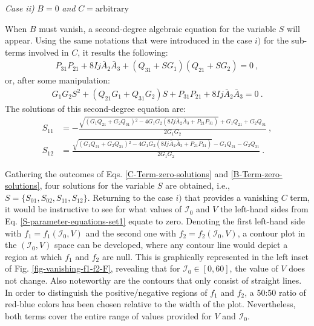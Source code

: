 \textit{Case ii)} $B=0$ \textit{and} $C=\text{arbitrary}$

When $B$ must vanish, a second-degree algebraic equation for the variable $S$ will appear. Using the same notations that were introduced in the case $i)$ for the sub-terms involved in $C$, it results the following:
\begin{align}
    P_{31}P_{21}+8Ij\bar{A}_2\bar{A}_3+\left(Q_{31}+SG_1\right)\left(Q_{21}+SG_2\right)=0\ , \nonumber
\end{align}
or, after some manipulation:
\begin{align}
    G_1G_2S^2+\left(Q_{21}G_1+Q_{31}G_2\right)S+P_{31}P_{21}+8Ij\bar{A}_2\bar{A}_3=0\ .
    \label{S-parameter-equations-set2}
\end{align}
The solutions of this second-degree equation are:
\begin{align}
    S_{11}&=-\frac{\sqrt{\left(G_1 Q_{21}+G_2 Q_{31}\right){}^2-4 G_1 G_2 \left(8 I j \bar{A}_2 \bar{A}_3+P_{21} P_{31}\right)}+G_1 Q_{21}+G_2 Q_{31}}{2 G_1 G_2}\ ,\nonumber\\
    S_{12}&=\frac{\sqrt{\left(G_1 Q_{21}+G_2 Q_{31}\right){}^2-4 G_1 G_2 \left(8 I j \bar{A}_2 \bar{A}_3+P_{21} P_{31}\right)}-G_1 Q_{21}-G_2 Q_{31}}{2 G_1 G_2}\ .
    \label{B-Term-zero-solutions}
\end{align}

Gathering the outcomes of Eqs. \ref{C-Term-zero-solutions} and \ref{B-Term-zero-solutions}, four solutions for the variable $S$ are obtained, i.e., $S=\{S_{01},S_{02},S_{11},S_{12}\}$. Returning to the case $i)$ that provides a vanishing $C$ term, it would be instructive to see for what values of $\mathcal{I}_0$ and $V$ the left-hand sides from Eq. \ref{S-parameter-equations-set1} equate to zero. Denoting the first left-hand side with $f_1=f_1(\mathcal{I}_0,V)$ and the second one with $f_2=f_2(\mathcal{I}_0,V)$, a contour plot in the $(\mathcal{I}_0,V)$ space can be developed, where any contour line would depict a region at which $f_1$ and $f_2$ are null. This is graphically represented in the left inset of Fig. \ref{fig-vanishing-f1-f2-F}, revealing that for $\mathcal{I}_0\in[0,60]$, the value of $V$ does not change. Also noteworthy are the contours that only consist of straight lines. In order to distinguish the positive/negative regions of $f_1$ and $f_2$, a 50:50 ratio of red-blue colors has been chosen relative to the width of the plot. Nevertheless, both terms cover the entire range of values provided for $V$ and $\mathcal{I}_0$.

